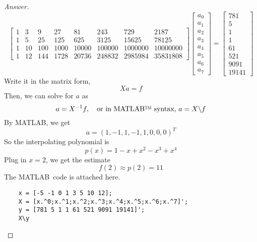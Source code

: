 \begin{proof}[Answer]
\[\begin{bmatrix}
1 &	3	&	9	&	27		&	81		&	243		&	729		&	2187	\\
1 &	5	&	25	&	125		&	625		&	3125	&	15625	&	78125	\\
1 &	10	&	100	&	1000	&	10000	&	100000	&	1000000	&	10000000\\
1 &	12	&	144	&	1728	&	20736	&	248832	&	2985984	&	35831808
\end{bmatrix}
\begin{bmatrix}
a_0 \\ a_1 \\ a_2 \\ a_3 \\ a_4 \\ a_5 \\ a_6 \\ a_7
\end{bmatrix}=
\begin{bmatrix}
781 \\ 5 \\ 1 \\ 1 \\ 61 \\ 521 \\ 9091 \\ 19141
\end{bmatrix}\]
Write it in the matrix form,
\[ Xa=f \]
Then, we can solve for $a$ as
\[ a=X^{-1}f, \quad \textrm{or in MATLAB\texttrademark\ syntax, } a=X\backslash f \]
By MATLAB\texttrademark, we get
\[ a=(1,-1,1,-1,1,0,0,0)^T \]
So the interpolating polynomial is
\[ p(x)=1-x+x^2-x^3+x^4 \]
Plug in $x=2$, we get the estimate
\[ f(2) \approx p(2) = 11 \]
The MATLAB\texttrademark\ code is attached here.
\begin{lstlisting}
	x = [-5 -1 0 1 3 5 10 12];
	X = [x.^0;x.^1;x.^2;x.^3;x.^4;x.^5;x.^6;x.^7]';
	y = [781 5 1 1 61 521 9091 19141]';
	X\y
\end{lstlisting}
\end{proof}


